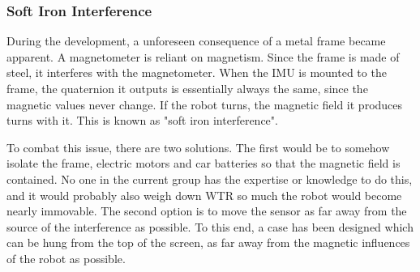 \subsubsection{Soft Iron Interference}
During the development, a unforeseen consequence of a metal frame became apparent.
A magnetometer is reliant on magnetism.
Since the frame is made of steel, it interferes with the magnetometer.
When the IMU is mounted to the frame, the quaternion it outputs is essentially always the same, since the magnetic values never change.
If the robot turns, the magnetic field it produces turns with it.
This is known as "soft iron interference".

To combat this issue, there are two solutions.
The first would be to somehow isolate the frame, electric motors and car batteries so that the magnetic field is contained.
No one in the current group has the expertise or knowledge to do this, and it would probably also weigh down WTR so much the robot would become nearly immovable.
The second option is to move the sensor as far away from the source of the interference as possible.
To this end, a case has been designed which can be hung from the top of the screen, as far away from the magnetic influences of the robot as possible.

\newpage    
    